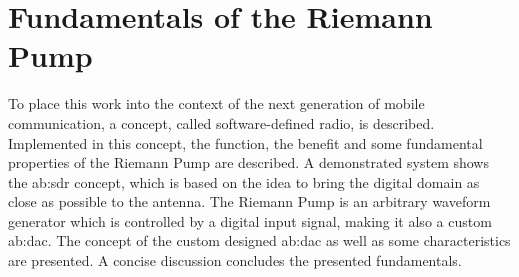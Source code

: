 \chapter{Fundamentals of the Riemann Pump}
\label{ch:fundamentals}
To place this work into the context of the next generation of mobile communication, a concept, called software-defined radio, is described.
Implemented in this concept, the function, the benefit and some fundamental properties of the Riemann Pump are described. 
A demonstrated system shows the \gls{ab:sdr} concept, which is based on the idea to bring the digital domain as close as possible to the antenna.
The Riemann Pump is an arbitrary waveform generator which is controlled by a digital input signal, making it also a custom \gls{ab:dac}.
The concept of the custom designed \gls{ab:dac} as well as some characteristics are presented.
A concise discussion concludes the presented fundamentals.

